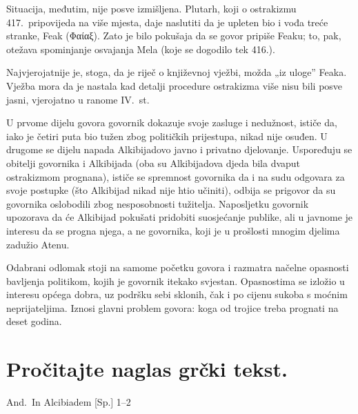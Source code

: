 Situacija, međutim, nije posve izmišljena. Plutarh, koji o ostrakizmu 417.\ pripovijeda na više mjesta, daje naslutiti da je upleten bio i vođa treće stranke, Feak (Φαίαξ). Zato je bilo pokušaja da se govor pripiše Feaku; to, pak, otežava spominjanje osvajanja Mela (koje se dogodilo tek 416.). 

Najvjerojatnije je, stoga, da je riječ o književnoj vježbi, možda „iz uloge” Feaka. Vježba mora da je nastala kad detalji procedure ostrakizma više nisu bili posve jasni, vjerojatno u ranome IV.~st.

U prvome dijelu govora govornik dokazuje svoje zasluge i nedužnost, ističe da, iako je četiri puta bio tužen zbog političkih prijestupa, nikad nije osuđen. U drugome se dijelu napada Alkibijadovo javno i privatno djelovanje. Uspoređuju se obitelji govornika i Alkibijada (oba su Alkibijadova djeda bila dvaput ostrakizmom prognana), ističe se spremnost govornika da i na sudu odgovara za svoje postupke (što Alkibijad nikad nije htio učiniti), odbija se prigovor da su govornika oslobodili zbog nesposobnosti tužitelja. Naposljetku govornik upozorava da će Alkibijad pokušati pridobiti suosjećanje publike, ali u javnome je interesu da se progna njega, a ne govornika, koji je u prošlosti mnogim djelima zadužio Atenu.

Odabrani odlomak stoji na samome početku govora i razmatra načelne opasnosti bavljenja politikom, kojih je govornik itekako svjestan. Opasnostima se izložio u interesu općega dobra, uz podršku sebi sklonih, čak i po cijenu sukoba s moćnim neprijateljima. Iznosi glavni problem govora: koga od trojice treba prognati na deset godina.


\section*{Pročitajte naglas grčki tekst.}

And.\ In Alcibiadem [Sp.] 1–2


\medskip


